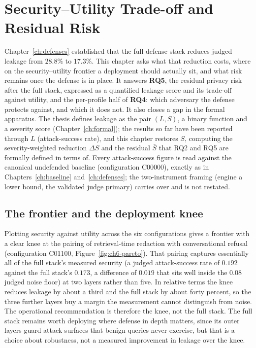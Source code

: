 \documentclass[11pt,a4paper]{report}
\begin{document}
\fi

\chapter{Security--Utility Trade-off and Residual Risk}
\label{ch:tradeoff}

Chapter~\ref{ch:defenses} established that the full defense stack reduces judged leakage from
$28.8\%$ to $17.3\%$. This chapter asks what that reduction costs, where on the
security--utility frontier a deployment should actually sit, and what risk remains once the
defense is in place. It answers \textbf{RQ5}, the residual privacy risk after the full
stack, expressed as a quantified leakage score and its trade-off against utility, and the
per-profile half of \textbf{RQ4}: which adversary the defense protects against, and which it
does not. It also closes a gap in the formal apparatus. The thesis defines leakage as the pair
$(L,S)$, a binary function and a severity score (Chapter~\ref{ch:formal}); the results so far
have been reported through $L$ (attack-success rate), and this chapter restores $S$, computing
the severity-weighted reduction $\Delta S$ and the residual $\bar{S}$ that RQ2 and RQ5 are
formally defined in terms of. Every attack-success figure is read against the canonical
undefended baseline (configuration C00000), exactly as in
Chapters~\ref{ch:baseline} and~\ref{ch:defenses}; the two-instrument framing (engine a lower
bound, the validated judge primary) carries over and is not restated.

\section{The frontier and the deployment knee}
\label{sec:ch6-knee}

Plotting security against utility across the six configurations gives a frontier with a clear
knee at the pairing of retrieval-time redaction with conversational refusal (configuration
C01100, Figure~\ref{fig:ch6-pareto}). That pairing captures essentially all of the full stack's
measured security (a judged attack-success rate of $0.192$ against the full stack's $0.173$,
a difference of $0.019$ that sits well inside the $0.08$ judged noise floor) at two layers
rather than five. In relative terms the knee reduces leakage by about a third and the full
stack by about forty percent, so the three further layers buy a margin the measurement cannot
distinguish from noise. The operational recommendation is therefore the knee, not the full
stack. The full stack remains worth deploying where defense in depth matters, since its outer
layers guard attack surfaces that benign queries never exercise, but that is a choice about
robustness, not a measured improvement in leakage over the knee.
\end{document}
